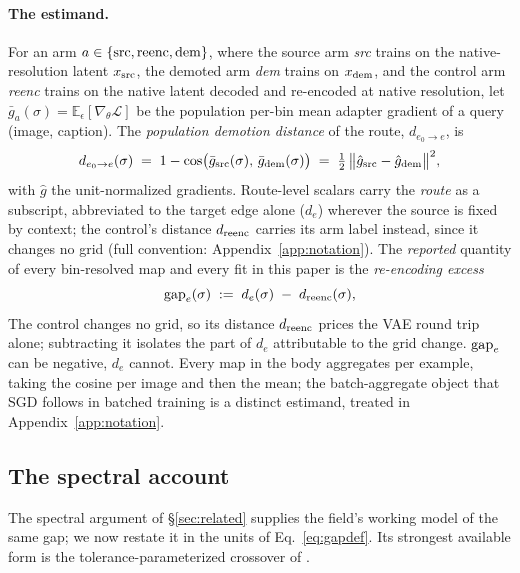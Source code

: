 \paragraph{The estimand.}
For an arm $a \in \{\mathrm{src}, \mathrm{reenc}, \mathrm{dem}\}$, where the source arm
\emph{src} trains on the native-resolution latent $x_{\mathrm{src}}$, the demoted
arm \emph{dem} trains on $x_{\mathrm{dem}}$, and the control arm \emph{reenc} trains
on the native latent decoded and re-encoded at native resolution, let
$\bar g_a(\sigma) = \mathbb{E}_\epsilon[\nabla_\theta \mathcal{L}]$ be
the population per-bin mean adapter gradient of a query (image,
caption). The \emph{population demotion distance} of the route,
$d_{e_0 \to e}$, is
\begin{equation}
d_{e_0 \to e}(\sigma) \;=\; 1 - \cos\!\big(\bar g_{\mathrm{src}}(\sigma),\,
\bar g_{\mathrm{dem}}(\sigma)\big)
\;=\; \tfrac{1}{2}\,\big\|\hat g_{\mathrm{src}} - \hat g_{\mathrm{dem}}\big\|^2,
\label{eq:gapdef}
\end{equation}
with $\hat g$ the unit-normalized gradients. Route-level scalars carry
the \emph{route} as a subscript, abbreviated to the target edge alone
($d_e$) wherever the source is fixed by context; the
control's distance $d_{\mathrm{reenc}}$ carries its arm label instead, since it
changes no grid (full convention: Appendix~\ref{app:notation}). The
\emph{reported} quantity of every bin-resolved map and every fit in this
paper is the \emph{re-encoding excess}
\begin{equation}
\mathrm{gap}_e(\sigma) \;:=\; d_e(\sigma) \;-\; d_{\mathrm{reenc}}(\sigma),
\label{eq:excess}
\end{equation}
The control changes no grid, so its distance $d_{\mathrm{reenc}}$ prices the
VAE round trip alone; subtracting it isolates the part of $d_e$
attributable to the grid change. $\mathrm{gap}_e$ can be negative, $d_e$
cannot. Every
map in the body aggregates per example, taking the cosine per image
and then the mean; the batch-aggregate object that SGD follows in
batched training is a distinct estimand, treated in
Appendix~\ref{app:notation}.

\subsection{The spectral account}
\label{sec:spectral}

The spectral argument of \S\ref{sec:related} supplies the field's
working model of the same gap; we now restate it in the units of
Eq.~\ref{eq:gapdef}. Its strongest available form is the
tolerance-parameterized crossover of \citet{xiao2026spd}.

